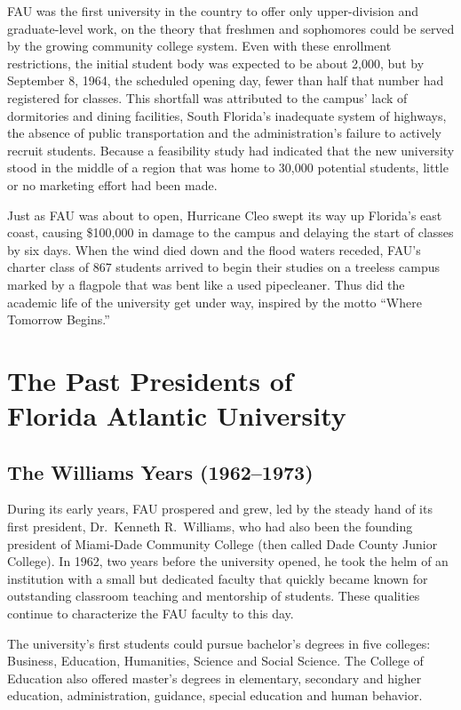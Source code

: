 \documentclass{article}
\begin{document}
FAU was the first university in the country to offer only upper-division and graduate-level work, on the theory that freshmen and sophomores could be served by the growing community college system.  Even with these enrollment restrictions, the initial student body was expected to be about 2,000, but by September 8, 1964, the scheduled opening day, fewer than half that number had registered for classes.  This shortfall was attributed to the campus' lack of dormitories and dining facilities, South Florida's inadequate system of highways, the absence of public transportation and the administration's failure to actively recruit students.  Because a feasibility study had indicated that the new university stood in the middle of a region that was home to 30,000 potential students, little or no marketing effort had been made.

Just as FAU was about to open, Hurricane Cleo swept its way up Florida's east coast, causing \$100,000 in damage to the campus and delaying the start of classes by six days.  When the wind died down and the flood waters receded, FAU's charter class of 867 students arrived to begin their studies on a treeless campus marked by a flagpole that was bent like a used pipecleaner.  Thus did the academic life of the university get under way, inspired by the motto ``Where Tomorrow Begins.''


\chapter[The Past Presidents of Florida Atlantic University]{The Past Presidents of\\ Florida Atlantic University}

\section{The Williams Years (1962--1973)}

During its early years, FAU prospered and grew, led by the steady hand of its first president, Dr.\ Kenneth R.\ Williams, who had also been the founding president of Miami-Dade Community College (then called Dade County Junior College).  In 1962, two years before the university opened, he took the helm of an institution with a small but dedicated faculty that quickly became known for outstanding classroom teaching and mentorship of students.  These qualities continue to characterize the FAU faculty to this day.

The university's first students could pursue bachelor's degrees in five colleges: Business, Education, Humanities, Science and Social Science.  The College of Education also offered master's degrees in elementary, secondary and higher education, administration, guidance, special education and human behavior.
\end{document}
